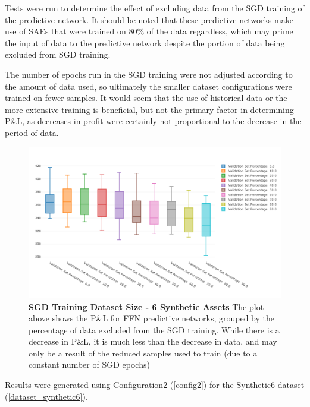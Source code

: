 \documentclass[a4paper,latin]{paper}
\begin{document}
Tests were run to determine the effect of excluding data from the SGD training of the predictive network. It should be noted that these predictive networks make use of SAEs that were trained on 80\% of the data regardless, which may prime the input of data to the predictive network despite the portion of data being excluded from SGD training. \newline

The number of epochs run in the SGD training were not adjusted according to the amount of data used, so ultimately the smaller dataset configurations were trained on fewer samples. It would seem that the use of historical data or the more extensive training is beneficial, but not the primary factor in determining P\&L, as decreases in profit were certainly not proportional to the decrease in the period of data.

\begin{figure}[H]
	\centering \includegraphics[scale=0.3]{images/iteration_three/it3_validationset.png}
	\caption{\textbf{SGD Training Dataset Size - 6 Synthetic Assets} \newline The plot above shows the P\&L for FFN predictive networks, grouped by the percentage of data excluded from the SGD training. While there is a decrease in P\&L, it is much less than the decrease in data, and may only be a result of the reduced samples used to train (due to a constant number of SGD epochs)}
	\label{figure-results_it3_validationset}
\end{figure}

Results were generated using Configuration2 (\ref{config2}) for the Synthetic6 dataset (\ref{dataset_synthetic6}). 

\newline
{}\newline
\end{document}
